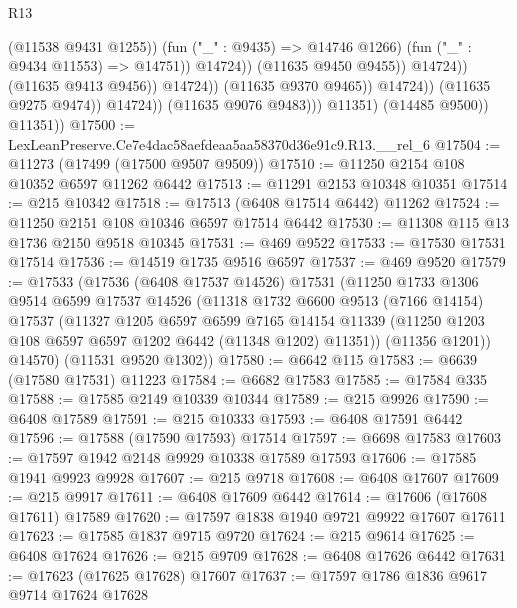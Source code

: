 \begin{lexlean}{R13}
\begin{coremodule}
                                                (@11538 @9431 @1255))
                                              (fun ("_" : @9435) => @14746 @1266)
                                              (fun ("_" : @9434 @11553) => @14751))
                                            @14724))
                                        (@11635 @9450 @9455))
                                      @14724))
                                  (@11635 @9413 @9456))
                                @14724))
                            (@11635 @9370 @9465))
                          @14724))
                      (@11635 @9275 @9474))
                    @14724))
                (@11635 @9076 @9483)))
            @11351)
          (@14485 @9500))
        @11351))
@17500 := LexLeanPreserve.Ce7e4dac58aefdeaa5aa58370d36e91c9.R13.__rel_6
@17504 := @11273 (@17499 (@17500 @9507 @9509))
@17510 := @11250 @2154 @108 @10352 @6597 @11262 @6442
@17513 := @11291 @2153 @10348 @10351
@17514 := @215 @10342
@17518 := @17513 (@6408 @17514 @6442) @11262
@17524 := @11250 @2151 @108 @10346 @6597 @17514 @6442
@17530 := @11308 @115 @13 @1736 @2150 @9518 @10345
@17531 := @469 @9522
@17533 := @17530 @17531 @17514
@17536 := @14519 @1735 @9516 @6597
@17537 := @469 @9520
@17579 := @17533
    (@17536
      (@6408 @17537 @14526)
      @17531
      (@11250
        @1733
        @1306
        @9514
        @6599
        @17537
        @14526
        (@11318
          @1732
          @6600
          @9513
          (@7166 @14154)
          @17537
          (@11327
            @1205
            @6597
            @6599
            @7165
            @14154
            @11339
            (@11250 @1203 @108 @6597 @6597 @1202 @6442 (@11348 @1202) @11351))
          (@11356 @1201))
        @14570)
      (@11531 @9520 @1302))
@17580 := @6642 @115
@17583 := @6639 (@17580 @17531) @11223
@17584 := @6682 @17583
@17585 := @17584 @335
@17588 := @17585 @2149 @10339 @10344
@17589 := @215 @9926
@17590 := @6408 @17589
@17591 := @215 @10333
@17593 := @6408 @17591 @6442
@17596 := @17588 (@17590 @17593) @17514
@17597 := @6698 @17583
@17603 := @17597 @1942 @2148 @9929 @10338 @17589 @17593
@17606 := @17585 @1941 @9923 @9928
@17607 := @215 @9718
@17608 := @6408 @17607
@17609 := @215 @9917
@17611 := @6408 @17609 @6442
@17614 := @17606 (@17608 @17611) @17589
@17620 := @17597 @1838 @1940 @9721 @9922 @17607 @17611
@17623 := @17585 @1837 @9715 @9720
@17624 := @215 @9614
@17625 := @6408 @17624
@17626 := @215 @9709
@17628 := @6408 @17626 @6442
@17631 := @17623 (@17625 @17628) @17607
@17637 := @17597 @1786 @1836 @9617 @9714 @17624 @17628

\end{coremodule}
\end{lexlean}
